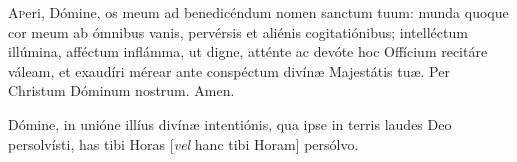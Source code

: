 \lettrine{A}{p}eri, Dómine, os meum ad benedicéndum nomen sanctum tuum: munda quoque cor meum ab ó\-mnibus vanis, pervérsis et aliénis cogitatiónibus; intelléctum illúmina, affé\-ctum inflámma, ut digne, atténte ac devóte hoc Offícium recitáre váleam, et exaudíri mérear ante conspéctum divínæ Majestátis tuæ. Per Christum Dóminum nostrum. \rr Amen.

Dómine, in unióne illíus divínæ intentiónis, qua ipse in terris laudes Deo persolvísti, has tibi Horas [\textit{vel} hanc tibi Horam] persólvo.